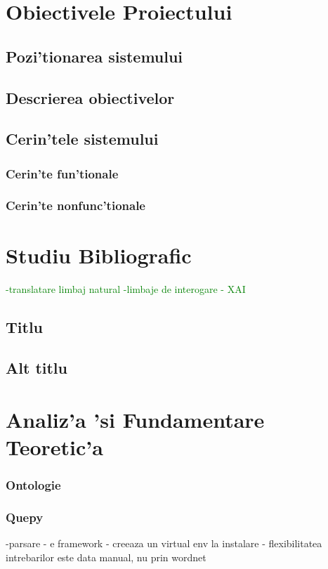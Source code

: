 \documentclass[12pt,a4paper,twoside]{report}
\begin{document}
\chapter{Obiectivele Proiectului}


\section{Pozi'tionarea sistemului}
\section{Descrierea obiectivelor}
\section{Cerin'tele sistemului}
\subsection{Cerin'te fun'tionale}
\subsection{Cerin'te nonfunc'tionale}

\chapter{Studiu Bibliografic}
\textcolor{green}{-translatare limbaj natural
-limbaje de interogare
- XAI}


\section{Titlu}
\section{Alt titlu}

\chapter{Analiz'a 'si Fundamentare Teoretic'a}
\label{ch:analysis}
\subsection{Ontologie}
\subsection{Quepy}
-parsare
- e framework
- creeaza un virtual env la instalare
- flexibilitatea intrebarilor este data manual, nu prin wordnet
\end{document}
